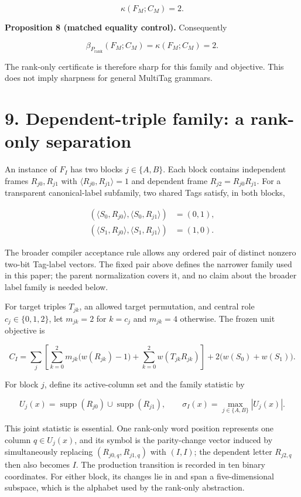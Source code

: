\documentclass[11pt]{article}
\begin{document}
\[
\kappa(F_M;C_M)=2.
\]

\textbf{Proposition 8 (matched equality control).} Consequently

\[
\beta_{P_{\mathrm{rank}}}(F_M;C_M)
=
\kappa(F_M;C_M)
=2.
\]

The rank-only certificate is therefore sharp for this family and objective. This does not imply sharpness for general MultiTag grammars.

\section*{9. Dependent-triple family: a rank-only separation}\label{dependent-triple-family-a-rank-only-separation}

An instance of \(F_I\) has two blocks \(j\in\{A,B\}\). Each block contains independent frames \(R_{j0},R_{j1}\) with \(\langle R_{j0},R_{j1}\rangle=1\) and dependent frame \(R_{j2}=R_{j0}R_{j1}\). For a transparent canonical-label subfamily, two shared Tags satisfy, in both blocks,

\[
\begin{aligned}
(\langle S_0,R_{j0}\rangle,\langle S_0,R_{j1}\rangle)&=(0,1),\\
(\langle S_1,R_{j0}\rangle,\langle S_1,R_{j1}\rangle)&=(1,0).
\end{aligned}
\]

The broader compiler acceptance rule allows any ordered pair of distinct nonzero two-bit Tag-label vectors. The fixed pair above defines the narrower family used in this paper; the parent normalization covers it, and no claim about the broader label family is needed below.

For target triples \(T_{jk}\), an allowed target permutation, and central role \(c_j\in\{0,1,2\}\), let \(m_{jk}=2\) for \(k=c_j\) and \(m_{jk}=4\) otherwise. The frozen unit objective is

\[
C_I=
\sum_{j}\left[
\sum_{k=0}^2m_{jk}\bigl(w(R_{jk})-1\bigr)
+\sum_{k=0}^2w(T_{jk}R_{jk})
\right]
+2\bigl(w(S_0)+w(S_1)\bigr).
\]

For block \(j\), define its active-column set and the family statistic by

\[
U_j(x)=\operatorname{supp}(R_{j0})\cup\operatorname{supp}(R_{j1}),
\qquad
\sigma_I(x)=\max_{j\in\{A,B\}}|U_j(x)|.
\]

This joint statistic is essential. One rank-only word position represents one column \(q\in U_j(x)\), and its symbol is the parity-change vector induced by simultaneously replacing \((R_{j0,q},R_{j1,q})\) with \((I,I)\); the dependent letter \(R_{j2,q}\) then also becomes \(I\). The production transition is recorded in ten binary coordinates. For either block, its changes lie in and span a five-dimensional subspace, which is the alphabet used by the rank-only abstraction.
\end{document}
